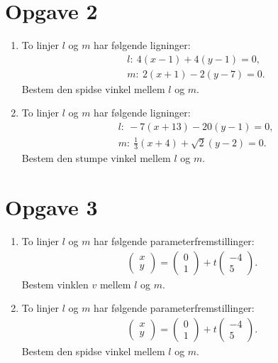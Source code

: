 \section*{Opgave 2}

\begin{enumerate}[label=\roman*)]
	\item To linjer $l$ og $m$ har følgende ligninger:
	\begin{align*}
		&l: \	4(x-1) + 4(y-1) =0,\\
		&m: \ 2(x+1) -2(y-7) = 0.
	\end{align*}	 
	Bestem den spidse vinkel mellem $l$ og $m$. 
	\item To linjer $l$ og $m$ har følgende ligninger:
	\begin{align*}
		&l: \ -7(x+13) - 20(y-1) = 0,\\
		&m: \ \frac{1}{3}(x+4) + \sqrt{2}(y-2) = 0.
	\end{align*}
	Bestem den stumpe vinkel mellem $l$ og $m$. 
\end{enumerate}



\section*{Opgave 3}
\begin{enumerate}[label=\roman*)]
	\item To linjer $l$ og $m$ har følgende parameterfremstillinger:
	\begin{align*}
		\begin{pmatrix}
			x \\ y
		\end{pmatrix}=
		\begin{pmatrix}
			0 \\ 1
		\end{pmatrix}+ t
		\begin{pmatrix}
			-4 \\ 5
		\end{pmatrix}.
	\end{align*}
	Bestem vinklen $v$ mellem $l$ og $m$. 
	
	\item To linjer $l$ og $m$ har følgende parameterfremstillinger:
	\begin{align*}
		\begin{pmatrix}
			x \\ y
		\end{pmatrix}=
		\begin{pmatrix}
			0 \\ 1
		\end{pmatrix}+ t
		\begin{pmatrix}
			-4 \\ 5
		\end{pmatrix}.
	\end{align*}
	Bestem den spidse vinkel mellem $l$ og $m$. 
\end{enumerate}


